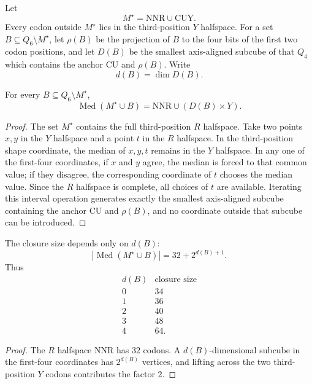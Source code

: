 \begin{definition}
\label{def:philosophy-anchor-subcube-span}
Let
$$
  M^{\star}=\mathrm{NNR}\cup\mathrm{CUY}.
$$
Every codon outside $M^{\star}$ lies in the third-position $Y$
halfspace. For a set $B\subseteq Q_{6}\setminus M^{\star}$, let
$\rho(B)$ be the projection of $B$ to the four bits of the first two
codon positions, and let $D(B)$ be the smallest axis-aligned subcube of
that $Q_{4}$ which contains the anchor $\mathrm{CU}$ and $\rho(B)$.
Write
$$
  d(B)=\dim D(B).
$$
\end{definition}

\begin{theorem}
\label{thm:philosophy-anchor-subcube-closure-formula}
For every $B\subseteq Q_{6}\setminus M^{\star}$,
$$
  \operatorname{Med}(M^{\star}\cup B)
  =
  \mathrm{NNR}\cup(D(B)\times Y).
$$
\end{theorem}
\begin{proof}
The set $M^{\star}$ contains the full third-position $R$ halfspace. Take
two points $x,y$ in the $Y$ halfspace and a point $t$ in the $R$
halfspace. In the third-position shape coordinate, the median of
$x,y,t$ remains in the $Y$ halfspace. In any one of the first-four
coordinates, if $x$ and $y$ agree, the median is forced to that common
value; if they disagree, the corresponding coordinate of $t$ chooses
the median value. Since the $R$ halfspace is complete, all choices of
$t$ are available. Iterating this interval operation generates exactly
the smallest axis-aligned subcube containing the anchor $\mathrm{CU}$
and $\rho(B)$, and no coordinate outside that subcube can be introduced.
\end{proof}

\begin{corollary}
\label{cor:philosophy-closure-size-by-span-dimension}
The closure size depends only on $d(B)$:
$$
  |\operatorname{Med}(M^{\star}\cup B)|
  =
  32+2^{d(B)+1}.
$$
Thus
$$
\begin{array}{c|r}
  d(B) & \text{closure size}\\
  \hline
  0 & 34\\
  1 & 36\\
  2 & 40\\
  3 & 48\\
  4 & 64.
\end{array}
$$
\end{corollary}
\begin{proof}
The $R$ halfspace $\mathrm{NNR}$ has $32$ codons. A $d(B)$-dimensional
subcube in the first-four coordinates has $2^{d(B)}$ vertices, and
lifting across the two third-position $Y$ codons contributes the factor
$2$.
\end{proof}


